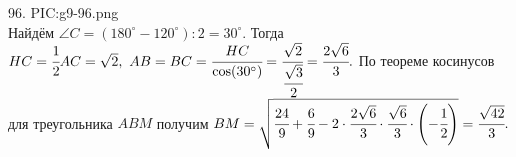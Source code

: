 96. {{PIC:g9-96.png}}\\
Найдём $\angle C=(180^\circ-120^\circ):2=30^\circ.$ Тогда  $HC=\cfrac{1}{2}AC=\sqrt{2},\ AB=BC=\cfrac{HC}{\cos(30^\circ)}=\cfrac{\sqrt{2}}{\cfrac{\sqrt{3}}{2}}=\cfrac{2\sqrt{6}}{3}.$ По теореме косинусов для треугольника $ABM$ получим $BM=\sqrt{\cfrac{24}{9}+\cfrac{6}{9}-2\cdot\cfrac{2\sqrt{6}}{3}\cdot\cfrac{\sqrt{6}}{3}\cdot\left(-\cfrac{1}{2}\right)}=\cfrac{\sqrt{42}}{3}.$\newpage\noindent
